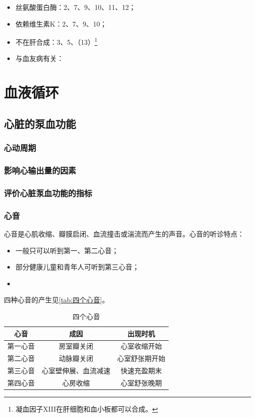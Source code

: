 \begin{itemize}
	\item 丝氨酸蛋白酶：2、7、9、10、11、12；
	\item 依赖维生素K：2、7、9、10；
	\item 不在肝合成：3、5、（13）\footnote{凝血因子XIII在肝细胞和血小板都可以合成。}
	\item 与血友病有关：
\end{itemize}
\section{血液循环}

\subsection{心脏的泵血功能}

\subsubsection{心动周期}

\subsubsection{影响心输出量的因素}

\subsubsection{评价心脏泵血功能的指标}

\subsubsection{心音}

心音是心肌收缩、瓣膜启闭、血流撞击或湍流而产生的声音。心音的听诊特点：

\begin{itemize}
	\item 一般只可以听到第一、第二心音；
	\item 部分健康儿童和青年人可听到第三心音；
	\item {}
\end{itemize}

四种心音的产生见\autoref{tab:四个心音}。

\begin{table}[htbp]
	\centering
	\begin{tabularx}{\textwidth}{|c|C|C|}
		\hline
		心音 & 成因 & 出现时机 \\ \hline
		第一心音 & 房室瓣关闭 & 心室收缩开始 \\ \hline
		第二心音 & 动脉瓣关闭 & 心室舒张期开始 \\ \hline
		第三心音 & 心室壁伸展、血流减速 & 快速充盈期末 \\ \hline
		第四心音 & 心房收缩 & 心室舒张晚期 \\ \hline
	\end{tabularx}
	\caption{四个心音}
	\label{tab:四个心音}
\end{table}

